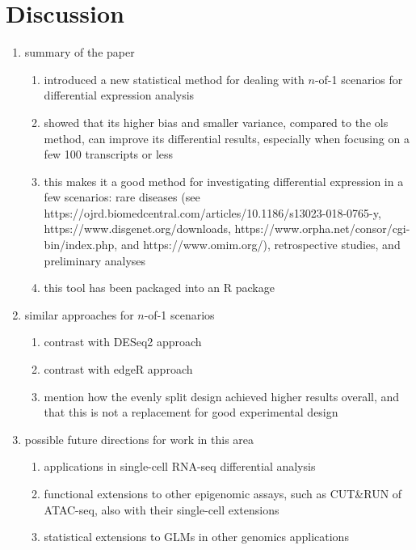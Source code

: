 \section{Discussion}

\begin{enumerate}
  \item summary of the paper
  \begin{enumerate}
    \item introduced a new statistical method for dealing with $n$-of-1 scenarios for differential expression analysis
    \item showed that its higher bias and smaller variance, compared to the \gls{ols} method, can improve its differential results, especially when focusing on a few 100 transcripts or less
    \item this makes it a good method for investigating differential expression in a few scenarios: rare diseases (see https://ojrd.biomedcentral.com/articles/10.1186/s13023-018-0765-y, https://www.disgenet.org/downloads, https://www.orpha.net/consor/cgi-bin/index.php, and https://www.omim.org/), retrospective studies, and preliminary analyses
    \item this tool has been packaged into an R package
  \end{enumerate}
  \item similar approaches for $n$-of-1 scenarios
  \begin{enumerate}
    \item contrast with DESeq2 approach
    \item contrast with edgeR approach
    \item mention how the evenly split design achieved higher results overall, and that this is not a replacement for good experimental design
  \end{enumerate}
  \item possible future directions for work in this area
  \begin{enumerate}
    \item applications in single-cell RNA-seq differential analysis
    \item functional extensions to other epigenomic assays, such as CUT\&RUN of ATAC-seq, also with their single-cell extensions
    \item statistical extensions to GLMs in other genomics applications
  \end{enumerate}
\end{enumerate}
